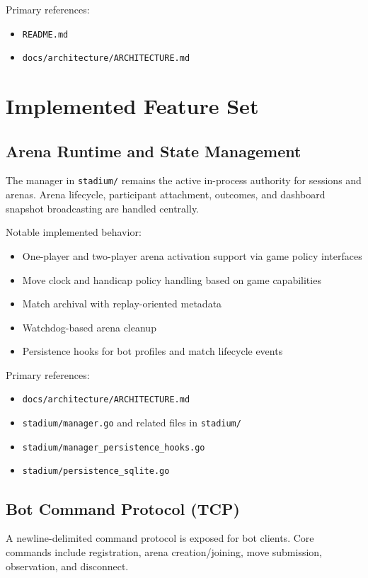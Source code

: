 \documentclass[11pt]{article}
\begin{document}
Primary references:
\begin{itemize}[leftmargin=*]
  \item \texttt{README.md}
  \item \texttt{docs/architecture/ARCHITECTURE.md}
\end{itemize}

\section{Implemented Feature Set}
\subsection{Arena Runtime and State Management}
The manager in \texttt{stadium/} remains the active in-process authority for sessions and arenas. Arena lifecycle, participant attachment, outcomes, and dashboard snapshot broadcasting are handled centrally.

Notable implemented behavior:
\begin{itemize}[leftmargin=*]
  \item One-player and two-player arena activation support via game policy interfaces
  \item Move clock and handicap policy handling based on game capabilities
  \item Match archival with replay-oriented metadata
  \item Watchdog-based arena cleanup
  \item Persistence hooks for bot profiles and match lifecycle events
\end{itemize}

Primary references:
\begin{itemize}[leftmargin=*]
  \item \texttt{docs/architecture/ARCHITECTURE.md}
  \item \texttt{stadium/manager.go} and related files in \texttt{stadium/}
  \item \texttt{stadium/manager\_persistence\_hooks.go}
  \item \texttt{stadium/persistence\_sqlite.go}
\end{itemize}

\subsection{Bot Command Protocol (TCP)}
A newline-delimited command protocol is exposed for bot clients. Core commands include registration, arena creation/joining, move submission, observation, and disconnect.
\end{document}
